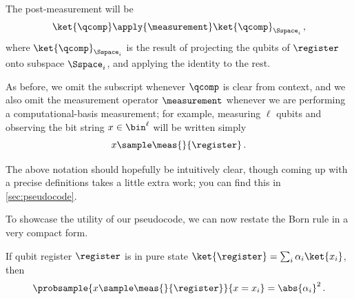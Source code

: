     The post-measurement will be 
      \[
        \ket{\qcomp} \apply{\measurement} \ket{\qcomp}_{\Sspace_i}\, ,
      \]
      where $\ket{\qcomp}_{\Sspace_i}$ is the result of projecting the
      qubits of $\register$ onto subspace $\Sspace_i$, and applying the
      identity to the rest.

    As before, we omit the subscript whenever $\qcomp$ is clear from context,
      and we also omit the measurement operator $\measurement$ whenever we are
      performing a computational-basis measurement; for example, measuring
      $\ell$ qubits and observing the bit string $x \in \bin^\ell$ will
      be written simply
    \[
      x \sample \meas{}{\register}\, .
    \]

    \noindent
    The above notation should hopefully be intuitively clear, though coming up
      with a precise definitions takes a little extra work; you can find this in
      \cref{sec:pseudocode}. 

    To showcase the utility of our pseudocode, we can now restate the Born
      rule in a very compact form.

    \begin{lemma}\label{def:Born}
      If qubit register $\register$ is in pure state $\ket{\register} =
      \sum_i \alpha_i \ket{x_i}$, then
      \[
        \probsample{x \sample \meas{}{\register}}{x = x_i} = \abs{\alpha_i}^2\, .
      \]
    \end{lemma}
